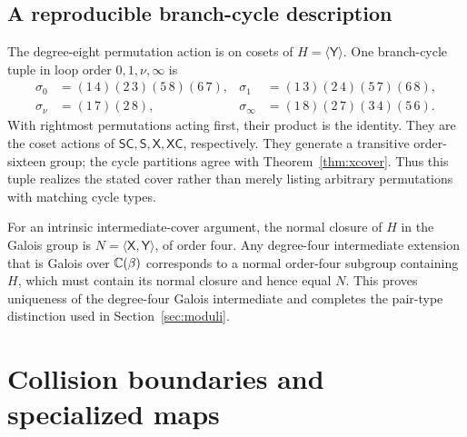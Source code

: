 
\subsection{A reproducible branch-cycle description}
The degree-eight permutation action is on cosets of \(H=\langle\mathsf Y\rangle\). One branch-cycle tuple in loop order \(0,1,\nu,\infty\) is
\begin{align}
\sigma_0&=(1\,4)(2\,3)(5\,8)(6\,7),&
\sigma_1&=(1\,3)(2\,4)(5\,7)(6\,8),\nonumber\\
\sigma_\nu&=(1\,7)(2\,8),&
\sigma_\infty&=(1\,8)(2\,7)(3\,4)(5\,6).\label{eq:cycles}
\end{align}
With rightmost permutations acting first, their product is the identity. They are the coset actions of \(\mathsf S\mathsf C,\mathsf S,\mathsf X,\mathsf X\mathsf C\), respectively. They generate a transitive order-sixteen group; the cycle partitions agree with Theorem~\ref{thm:xcover}. Thus this tuple realizes the stated cover rather than merely listing arbitrary permutations with matching cycle types.

For an intrinsic intermediate-cover argument, the normal closure of \(H\) in the Galois group is
\(N=\langle\mathsf X,\mathsf Y\rangle\), of order four. Any degree-four intermediate extension that is Galois over \(\mathbb C(\beta)\) corresponds to a normal order-four subgroup containing \(H\), which must contain its normal closure and hence equal \(N\). This proves uniqueness of the degree-four Galois intermediate and completes the pair-type distinction used in Section~\ref{sec:moduli}.

\section{Collision boundaries and specialized maps}\label{sec:boundary}

